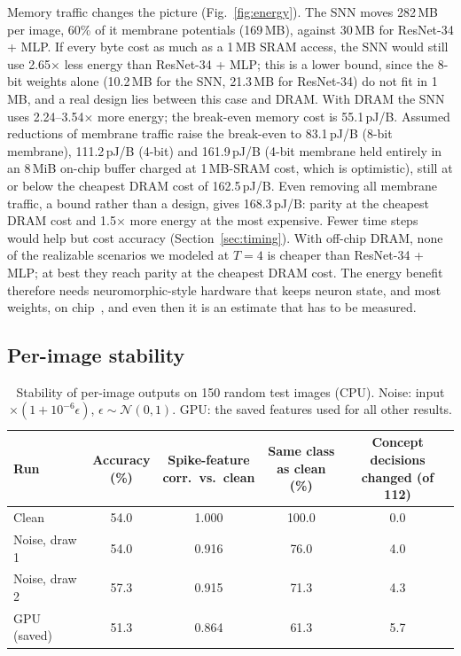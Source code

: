 \documentclass[conference]{IEEEtran}
\begin{document}
Memory traffic changes the picture (Fig.~\ref{fig:energy}). The SNN moves 282\,MB per image, 60\% of it membrane potentials (169\,MB), against 30\,MB for ResNet-34 + MLP. If every byte cost as much as a 1\,MB SRAM access, the SNN would still use 2.65$\times$ less energy than ResNet-34 + MLP; this is a lower bound, since the 8-bit weights alone (10.2\,MB for the SNN, 21.3\,MB for ResNet-34) do not fit in 1\,MB, and a real design lies between this case and DRAM. With DRAM the SNN uses 2.24--3.54$\times$ more energy; the break-even memory cost is 55.1\,pJ/B. Assumed reductions of membrane traffic raise the break-even to 83.1\,pJ/B (8-bit membrane), 111.2\,pJ/B (4-bit) and 161.9\,pJ/B (4-bit membrane held entirely in an 8\,MiB on-chip buffer charged at 1\,MB-SRAM cost, which is optimistic), still at or below the cheapest DRAM cost of 162.5\,pJ/B. Even removing all membrane traffic, a bound rather than a design, gives 168.3\,pJ/B: parity at the cheapest DRAM cost and 1.5$\times$ more energy at the most expensive. Fewer time steps would help but cost accuracy (Section~\ref{sec:timing}). With off-chip DRAM, none of the realizable scenarios we modeled at $T=4$ is cheaper than ResNet-34 + MLP; at best they reach parity at the cheapest DRAM cost. The energy benefit therefore needs neuromorphic-style hardware that keeps neuron state, and most weights, on chip~\cite{dampfhoffer2023snns,davies2018loihi}, and even then it is an estimate that has to be measured.

\subsection{Per-image stability}\label{sec:stab}

\begin{table}[t]
\caption{Stability of per-image outputs on 150 random test images (CPU). Noise: input $\times(1+10^{-6}\epsilon)$, $\epsilon\sim\mathcal{N}(0,1)$. GPU: the saved features used for all other results.}
\label{tab:stab}
\centering
\footnotesize
\setlength{\tabcolsep}{3pt}
\begin{tabular}{@{}lcccc@{}}
\toprule
Run & \makecell{Accuracy\\(\%)} & \makecell{Spike-feature\\corr.\ vs.\ clean} & \makecell{Same class\\as clean (\%)} & \makecell{Concept decisions\\changed (of 112)} \\
\midrule
Clean & 54.0 & 1.000 & 100.0 & 0.0 \\
Noise, draw 1 & 54.0 & 0.916 & 76.0 & 4.0 \\
Noise, draw 2 & 57.3 & 0.915 & 71.3 & 4.3 \\
GPU (saved) & 51.3 & 0.864 & 61.3 & 5.7 \\
\bottomrule
\end{tabular}
\end{table}
\end{document}
